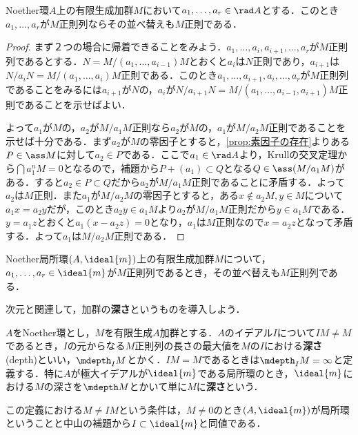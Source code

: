 \begin{prop}
	Noether環$A$上の有限生成加群$M$において$a_1,\dots,a_r\in\rad A$とする．このとき$a_1,\dots,a_r$が$M$正則列ならその並べ替えも$M$正則である．
\end{prop}

\begin{proof}
	まず２つの場合に帰着できることをみよう．$a_1,\dots,a_i,a_{i+1},\dots,a_r$が$M$正則列であるとする．$N=M/(a_1,\dots,a_{i-1})M$とおくと$a_i$は$N$正則であり，$a_{i+1}$は$N/a_iN=M/(a_1,\dots,a_i)M$正則である．このとき$a_1,\dots,a_{i+1},a_i,\dots,a_r$が$M$正則列であることをみるには$a_{i+1}$が$N$の，$a_i$が$N/a_{i+1}N=M/(a_1,\dots,a_{i-1},a_{i+1})M$正則であることを示せばよい．
	
	よって$a_1$が$M$の，$a_2$が$M/a_1M$正則なら$a_2$が$M$の，$a_1$が$M/a_2M$正則であることを示せば十分である．まず$a_2$が$M$の零因子とすると，\ref{prop:素因子の存在}よりある$P\in\ass M$に対して$a_2\in P$である．ここで$a_1\in\rad A$より，Krullの交叉定理から$\bigcap a_1^nM=0$となるので，補題から$P+(a_1)\subset Q$となる$Q\in\ass (M/a_1M)$がある．すると$a_2\in P\subset Q$だから$a_2$が$M/a_1M$正則であることに矛盾する．よって$a_2$は$M$正則．また$a_1$が$M/a_2M$の零因子とすると，ある$x\not\in a_2M,y\in M$について$a_1x=a_2y$だが，このとき$a_2y\in a_1M$より$a_2$が$M/a_1M$正則だから$y\in a_1M$である．$y=a_1z$とおくと$a_1(x-a_2z)=0$となり，$a_1$は$M$正則なので$x=a_2z$となって矛盾する．よって$a_1$は$M/a_2M$正則である．
\end{proof}

\begin{cor}
	Noether局所環$(A,\ideal{m})$上の有限生成加群$M$について，$a_1,\dots,a_r\in\ideal{m}$が$M$正則列であるとき，その並べ替えも$M$正則列である．
\end{cor}

次元と関連して，加群の\textbf{深さ}というものを導入しよう．

\begin{defi}[深さ]
	$A$をNoether環とし，$M$を有限生成$A$加群とする．$A$のイデアル$I$について$IM\neq M$であるとき，$I$の元からなる$M$正則列の長さの最大値を$M$の$I$における\textbf{深さ}(depth)といい，$\mdepth_I M$とかく．$IM=M$であるときは$\mdepth_I M=\infty$と定義する．特に$A$が極大イデアルが$\ideal{m}$である局所環のとき，$\ideal{m}$における$M$の深さを$\mdepth M$とかいて単に$M$に\textbf{深さ}という．
\end{defi}

この定義における$M\neq IM$という条件は，$M\neq0$のとき$(A,\ideal{m})$が局所環ということと中山の補題から$I\subset\ideal{m}$と同値である．

